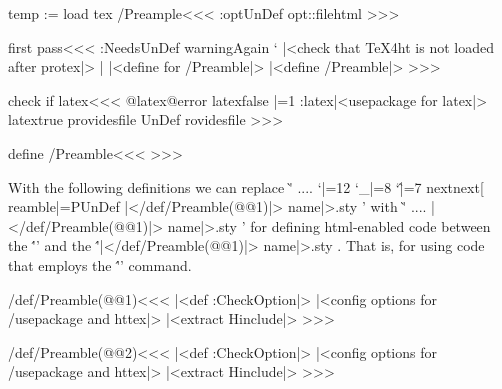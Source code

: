 \<temp := load tex /Preample\><<<
\ifx \config:opt\:UnDef
   \edef\config:opt{\ifx \config:file\empty html\fi}\fi
\def\:temp{\expandafter\expandafter\expandafter
   \Preamble\expandafter{\config:opt}\EndPreamble}
>>>



\<first pass\><<<
\ifx \Log:Needs\:UnDef \else 
   \:warning{Again `\noexpand}\fi
|<check that TeX4ht is not loaded after protex|>  |%
|<define for /Preamble|>
|<define /Preamble|>
>>>



\<check if latex\><<<
\expandafter\ifx \csname @latex@error\endcsname\relax
    \:latexfalse  \tracingstats|=1
\else  
   \if:latex\else |<usepackage for latex|>\fi
   \:latextrue 
   \ifx \:providesfile \:UnDef
      \let\:providesfile\@providesfile
      \def\@providesfile#1{%
         \expandafter\ifx\csname @filelist\endcsname\relax
               \let\@providesfile\:providesfile
         \else \xdef\@filelist{\@filelist,#1}%
         \fi
         \:providesfile{#1}%
      }
   \fi
\fi
>>>





\<define /Preamble\><<<
\def\:Preamble{\ifx \:next[%
  \def\Preamble[##1]##2{\egroup 
    |</def/Preamble(@@2)|>   
    }
  \else
  \def\Preamble##1{\egroup |</def/Preamble(@@1)|>%
                   name|>.sty }
  \fi        \let\:Preamble|=\:UnDef     \Preamble  }
\def\Preamble{\bgroup  \catcode`\@|=12   \catcode`\_|=8  \catcode`\^|=7
  \futurelet\:next\:Preamble}
>>>


With the following definitions we can replace
\`'   \Htmltrue .... \Htmlfalse \Preamble{html,...}'
with \`'   \Htmltrue ....  \Preamble{...}'  
for defining html-enabled code between the \''' and the
\''\Preamble'.  That is, for using code that employs the
\''\ifHtml' command.



\</def/Preamble(@@1)\><<<
|<def :CheckOption|>%
\ifHtml  \Htmlfalse
     \def\Preamble{html,##1}\else \def\Preamble{##1}\fi
|<config options for /usepackage and httex|>%
|<extract Hinclude|>%
>>>

\</def/Preamble(@@2)\><<<
|<def :CheckOption|>%
\ifHtml  \Htmlfalse
     \def\Preamble{html,##2}\else \def\Preamble{##2}\fi
|<config options for /usepackage and httex|>%
|<extract Hinclude|>%
>>>


